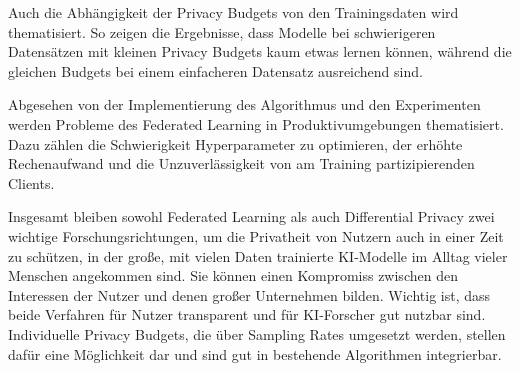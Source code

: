 Auch die Abhängigkeit der Privacy Budgets von den Trainingsdaten wird thematisiert. So zeigen die Ergebnisse, dass Modelle bei schwierigeren Datensätzen mit kleinen Privacy Budgets kaum etwas lernen können, während die gleichen Budgets bei einem einfacheren Datensatz ausreichend sind.

Abgesehen von der Implementierung des Algorithmus und den Experimenten werden Probleme des Federated Learning in Produktivumgebungen thematisiert. Dazu zählen die Schwierigkeit Hyperparameter zu optimieren, der erhöhte Rechenaufwand und die Unzuverlässigkeit von am Training partizipierenden Clients.

Insgesamt bleiben sowohl Federated Learning als auch Differential Privacy zwei wichtige Forschungsrichtungen, um die Privatheit von Nutzern auch in einer Zeit zu schützen, in der große, mit vielen Daten trainierte KI-Modelle im Alltag vieler Menschen angekommen sind. Sie können einen Kompromiss zwischen den Interessen der Nutzer und denen großer Unternehmen bilden. Wichtig ist, dass beide Verfahren für Nutzer transparent und für KI-Forscher gut nutzbar sind. Individuelle Privacy Budgets, die über Sampling Rates umgesetzt werden, stellen dafür eine Möglichkeit dar und sind gut in bestehende Algorithmen integrierbar.